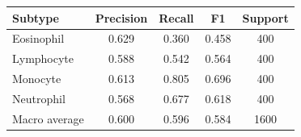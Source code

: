 \begin{tabular}{@{}lcccc@{}}
\toprule
Subtype & Precision & Recall & F1 & Support \\
\midrule
Eosinophil & 0.629 & 0.360 & 0.458 & 400 \\
Lymphocyte & 0.588 & 0.542 & 0.564 & 400 \\
Monocyte & 0.613 & 0.805 & 0.696 & 400 \\
Neutrophil & 0.568 & 0.677 & 0.618 & 400 \\
\midrule
Macro average & 0.600 & 0.596 & 0.584 & 1600 \\
\bottomrule
\end{tabular}
